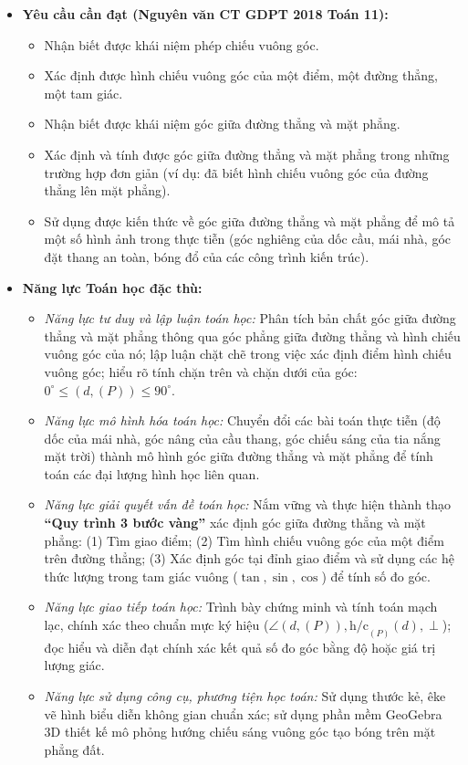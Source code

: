 \documentclass[12pt, a4paper]{article}
\begin{document}
\begin{itemize}[leftmargin=1.2cm]
    \item \textbf{Yêu cầu cần đạt (Nguyên văn CT GDPT 2018 Toán 11):}
    \begin{itemize}[leftmargin=0.6cm]
        \item Nhận biết được khái niệm phép chiếu vuông góc.
        \item Xác định được hình chiếu vuông góc của một điểm, một đường thẳng, một tam giác.
        \item Nhận biết được khái niệm góc giữa đường thẳng và mặt phẳng.
        \item Xác định và tính được góc giữa đường thẳng và mặt phẳng trong những trường hợp đơn giản (ví dụ: đã biết hình chiếu vuông góc của đường thẳng lên mặt phẳng).
        \item Sử dụng được kiến thức về góc giữa đường thẳng và mặt phẳng để mô tả một số hình ảnh trong thực tiễn (góc nghiêng của dốc cầu, mái nhà, góc đặt thang an toàn, bóng đổ của các công trình kiến trúc).
    \end{itemize}

    \item \textbf{Năng lực Toán học đặc thù:}
    \begin{itemize}[leftmargin=0.6cm]
        \item \textit{Năng lực tư duy và lập luận toán học:} Phân tích bản chất góc giữa đường thẳng và mặt phẳng thông qua góc phẳng giữa đường thẳng và hình chiếu vuông góc của nó; lập luận chặt chẽ trong việc xác định điểm hình chiếu vuông góc; hiểu rõ tính chặn trên và chặn dưới của góc: $0^\circ \le (d, (P)) \le 90^\circ$.
        \item \textit{Năng lực mô hình hóa toán học:} Chuyển đổi các bài toán thực tiễn (độ dốc của mái nhà, góc nâng của cầu thang, góc chiếu sáng của tia nắng mặt trời) thành mô hình góc giữa đường thẳng và mặt phẳng để tính toán các đại lượng hình học liên quan.
        \item \textit{Năng lực giải quyết vấn đề toán học:} Nắm vững và thực hiện thành thạo \textbf{``Quy trình 3 bước vàng''} xác định góc giữa đường thẳng và mặt phẳng: (1) Tìm giao điểm; (2) Tìm hình chiếu vuông góc của một điểm trên đường thẳng; (3) Xác định góc tại đỉnh giao điểm và sử dụng các hệ thức lượng trong tam giác vuông ($\tan, \sin, \cos$) để tính số đo góc.
        \item \textit{Năng lực giao tiếp toán học:} Trình bày chứng minh và tính toán mạch lạc, chính xác theo chuẩn mực ký hiệu ($\angle(d, (P)), \text{h/c}_{(P)}(d), \perp$); đọc hiểu và diễn đạt chính xác kết quả số đo góc bằng độ hoặc giá trị lượng giác.
        \item \textit{Năng lực sử dụng công cụ, phương tiện học toán:} Sử dụng thước kẻ, êke vẽ hình biểu diễn không gian chuẩn xác; sử dụng phần mềm GeoGebra 3D thiết kế mô phỏng hướng chiếu sáng vuông góc tạo bóng trên mặt phẳng đất.
    \end{itemize}


\end{itemize}
\end{document}
